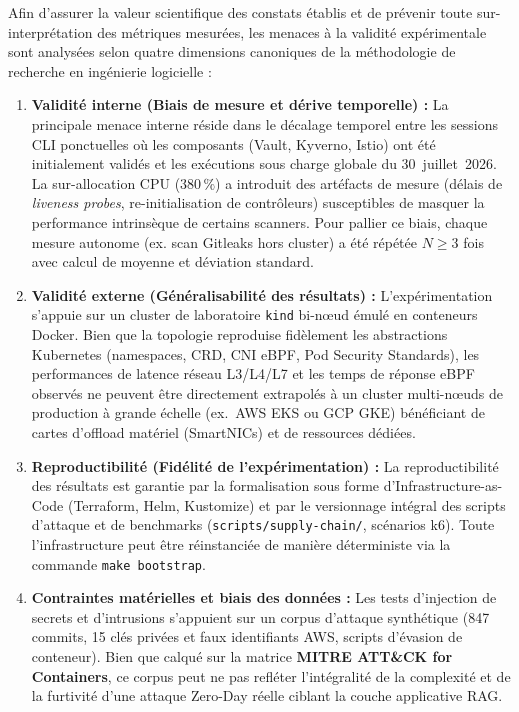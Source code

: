 Afin d'assurer la valeur scientifique des constats établis et de prévenir toute sur-interprétation des métriques mesurées, les menaces à la validité expérimentale sont analysées selon quatre dimensions canoniques de la méthodologie de recherche en ingénierie logicielle :

\begin{enumerate}
    \item \textbf{Validité interne (Biais de mesure et dérive temporelle) :} La principale menace interne réside dans le décalage temporel entre les sessions CLI ponctuelles où les composants (Vault, Kyverno, Istio) ont été initialement validés et les exécutions sous charge globale du 30~juillet~2026. La sur-allocation CPU ($380\,\%$) a introduit des artéfacts de mesure (délais de \textit{liveness probes}, re-initialisation de contrôleurs) susceptibles de masquer la performance intrinsèque de certains scanners. Pour pallier ce biais, chaque mesure autonome (ex. scan Gitleaks hors cluster) a été répétée $N \ge 3$ fois avec calcul de moyenne et déviation standard.
    \item \textbf{Validité externe (Généralisabilité des résultats) :} L'expérimentation s'appuie sur un cluster de laboratoire \texttt{kind} bi-nœud émulé en conteneurs Docker. Bien que la topologie reproduise fidèlement les abstractions Kubernetes (namespaces, CRD, CNI eBPF, Pod Security Standards), les performances de latence réseau L3/L4/L7 et les temps de réponse eBPF observés ne peuvent être directement extrapolés à un cluster multi-nœuds de production à grande échelle (ex.~AWS EKS ou GCP GKE) bénéficiant de cartes d'offload matériel (SmartNICs) et de ressources dédiées.
    \item \textbf{Reproductibilité (Fidélité de l'expérimentation) :} La reproductibilité des résultats est garantie par la formalisation sous forme d'Infrastructure-as-Code (Terraform, Helm, Kustomize) et par le versionnage intégral des scripts d'attaque et de benchmarks (\texttt{scripts/supply-chain/}, scénarios k6). Toute l'infrastructure peut être réinstanciée de manière déterministe via la commande \texttt{make bootstrap}.
    \item \textbf{Contraintes matérielles et biais des données :} Les tests d'injection de secrets et d'intrusions s'appuient sur un corpus d'attaque synthétique (847 commits, 15 clés privées et faux identifiants AWS, scripts d'évasion de conteneur). Bien que calqué sur la matrice \textbf{MITRE ATT\&CK for Containers}, ce corpus peut ne pas refléter l'intégralité de la complexité et de la furtivité d'une attaque Zero-Day réelle ciblant la couche applicative RAG.
\end{enumerate}

